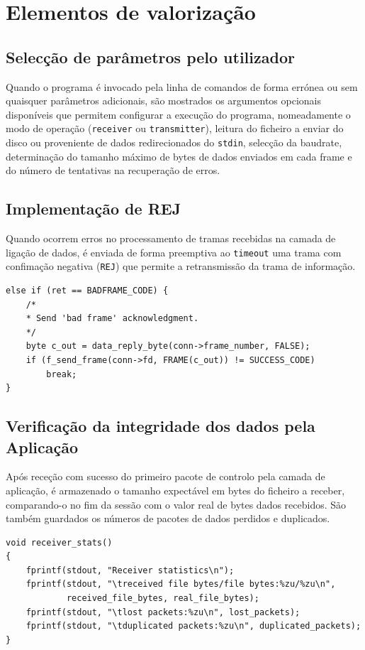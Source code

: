 \documentclass[a4paper,11pt,titlepage]{article}
\begin{document}
\section{Elementos de valorização}

\subsection{Selecção de parâmetros pelo utilizador}
Quando o programa é invocado pela linha de comandos de forma errónea ou sem quaisquer parâmetros adicionais, são mostrados os argumentos opcionais disponíveis que permitem configurar a execução do programa, nomeadamente o modo de operação (\texttt{receiver} ou \texttt{transmitter}), leitura do ficheiro a enviar do disco ou proveniente de dados redirecionados do \texttt{stdin}, selecção da baudrate, determinação do tamanho máximo de bytes de dados enviados em cada frame e do número de tentativas na recuperação de erros. 

\subsection{Implementação de REJ}
Quando ocorrem erros no processamento de tramas recebidas na camada de ligação de dados, é enviada de forma preemptiva ao \texttt{timeout} uma trama com confimação negativa (\texttt{REJ}) que permite a retransmissão da trama de informação.

\begin{lstlisting}[style=customc]
else if (ret == BADFRAME_CODE) {
	/*
	* Send 'bad frame' acknowledgment.
	*/
	byte c_out = data_reply_byte(conn->frame_number, FALSE);
	if (f_send_frame(conn->fd, FRAME(c_out)) != SUCCESS_CODE)
		break;
}
\end{lstlisting}

\subsection{Verificação da integridade dos dados pela Aplicação}
Após receção com sucesso do primeiro pacote de controlo pela camada de aplicação, é armazenado o tamanho expectável em bytes do ficheiro a receber, comparando-o no fim da sessão com o valor real de bytes dados recebidos. São também guardados os números de pacotes de dados perdidos e duplicados.

\begin{lstlisting}[style=customc]
void receiver_stats()
{
    fprintf(stdout, "Receiver statistics\n");
    fprintf(stdout, "\treceived file bytes/file bytes:%zu/%zu\n",
            received_file_bytes, real_file_bytes);
    fprintf(stdout, "\tlost packets:%zu\n", lost_packets);
    fprintf(stdout, "\tduplicated packets:%zu\n", duplicated_packets);
}
\end{lstlisting}
\end{document}
